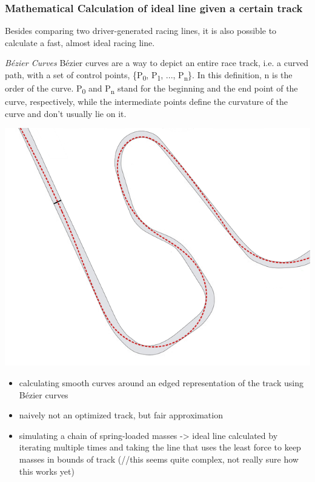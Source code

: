 \subsubsection{Mathematical Calculation of ideal line given a certain track}
Besides comparing two driver-generated racing lines, it is also possible to calculate a fast, almost ideal racing line.

\textit{Bézier Curves}
Bézier curves are a way to depict an entire race track, i.e. a curved path, with a set of control points, \{P\textsubscript{0}, P\textsubscript{1}, ..., P\textsubscript{n}\}. In this definition, n is the order of the curve. P\textsubscript{0} and P\textsubscript{n} stand for the beginning and the end point of the curve, respectively, while the intermediate points define the curvature of the curve and don't usually lie on it.

\includegraphics[width=\textwidth]{bezier_track}

\begin{itemize}
  \item calculating smooth curves around an edged representation of the track using Bézier curves
  \item naively not an optimized track, but fair approximation
  \item simulating a chain of spring-loaded masses -> ideal line calculated by iterating multiple times and taking the line that uses the least force to keep masses in bounds of track (//this seems quite complex, not really sure how this works yet)
\end{itemize}

